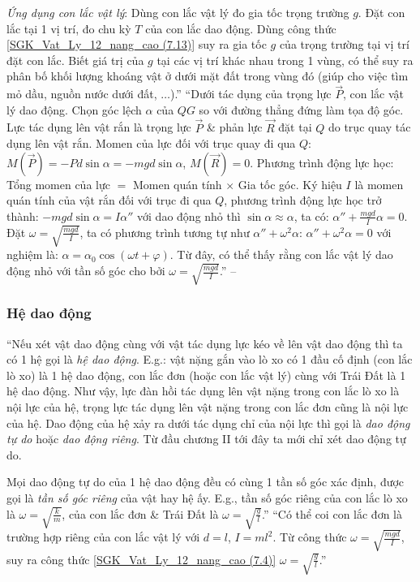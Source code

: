 \documentclass{article}
\numberwithin{equation}{section}
\begin{document}
\textit{Ứng dụng con lắc vật lý}: Dùng con lắc vật lý đo gia tốc trọng trường $g$. Đặt con lắc tại 1 vị trí, đo chu kỳ $T$ của con lắc dao động. Dùng công thức \eqref{SGK_Vat_Ly_12_nang_cao (7.13)} suy ra gia tốc $g$ của trọng trường tại vị trí đặt con lắc. Biết giá trị của $g$ tại các vị trí khác nhau trong 1 vùng, có thể suy ra phân bố khối lượng khoáng vật ở dưới mặt đất trong vùng đó (giúp cho việc tìm mỏ dầu, nguồn nước dưới đất, $\ldots$).'' ``Dưới tác dụng của trọng lực $\overrightarrow{P}$, con lắc vật lý dao động. Chọn góc lệch $\alpha$ của $QG$ so với đường thẳng đứng làm tọa độ góc. Lực tác dụng lên vật rắn là trọng lực $\overrightarrow{P}$ \& phản lực $\overrightarrow{R}$ đặt tại $Q$ do trục quay tác dụng lên vật rắn. Momen của lực đối với trục quay đi qua $Q$: $M(\overrightarrow{P}) = -Pd\sin\alpha = -mgd\sin\alpha$, $M(\overrightarrow{R}) = 0$. Phương trình động lực học: Tổng momen của lực $=$ Momen quán tính $\times$ Gia tốc góc. Ký hiệu $I$ là momen quán tính của vật rắn đối với trục đi qua $Q$, phương trình động lực học trở thành: $-mgd\sin\alpha = I\alpha''$ với dao động nhỏ thì $\sin\alpha\approx\alpha$, ta có: $\alpha'' + \frac{mgd}{I}\alpha = 0$. Đặt $\omega = \sqrt{\frac{mgd}{I}}$, ta có phương trình tương tự như $\alpha'' + \omega^2\alpha$: $\alpha'' + \omega^2\alpha = 0$ với nghiệm là: $\alpha = \alpha_0\cos(\omega t + \varphi)$. Từ đây, có thể thấy rằng con lắc vật lý dao động nhỏ với tần số góc cho bởi $\omega = \sqrt{\frac{mgd}{I}}$.'' -- \cite[pp. 38--39]{SGK_Vat_Ly_12_nang_cao}

\subsubsection{Hệ dao động}
``Nếu xét vật dao động cùng với vật tác dụng lực kéo về lên vật dao động thì ta có 1 hệ gọi là \textit{hệ dao động}. E.g.: vật nặng gắn vào lò xo có 1 đầu cố định (con lắc lò xo) là 1 hệ dao động, con lắc đơn (hoặc con lắc vật lý) cùng với Trái Đất là 1 hệ dao động. Như vậy, lực đàn hồi tác dụng lên vật nặng trong con lắc lò xo là nội lực của hệ, trọng lực tác dụng lên vật nặng trong con lắc đơn cũng là nội lực của hệ. Dao động của hệ xảy ra dưới tác dụng chỉ của nội lực thì gọi là \textit{dao động tự do} hoặc \textit{dao động riêng}. Từ đầu chương II tới đây ta mới chỉ xét dao động tự do.

Mọi dao động tự do của 1 hệ dao động đều có cùng 1 tần số góc xác định, được gọi là \textit{tần số góc riêng} của vật hay hệ ấy. E.g., tần số góc riêng của con lắc lò xo là $\omega = \sqrt{\frac{k}{m}}$, của con lắc đơn \& Trái Đất là $\omega = \sqrt{\frac{g}{l}}$.'' ``Có thể coi con lắc đơn là trường hợp riêng của con lắc vật lý với $d = l$, $I = ml^2$. Từ công thức $\omega = \sqrt{\frac{mgd}{I}}$, suy ra công thức \eqref{SGK_Vat_Ly_12_nang_cao (7.4)} $\omega = \sqrt{\frac{g}{l}}$.''
\end{document}
